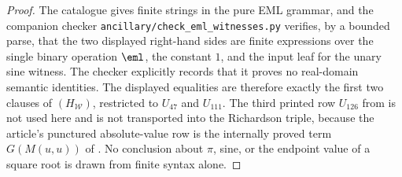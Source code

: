 \begin{proof}
The catalogue gives finite strings in the pure EML grammar, and the companion
checker \texttt{ancillary/check\_eml\_witnesses.py} verifies, by a bounded parse,
that the two displayed right-hand sides are finite expressions over the single
binary operation \(\eml\), the constant \(1\), and the input leaf for the unary
sine witness.  The checker explicitly records that it proves no real-domain
semantic identities.  The displayed equalities are therefore exactly the first
two clauses of \((H_{\mathcal W})\), restricted to \(U_{47}\) and \(U_{111}\).
The third printed row \(U_{126}\) from  is not used here and is not
transported into the Richardson triple, because the article's punctured
absolute-value row is the internally proved term \(G(M(u,u))\) of
.  No conclusion about \(\pi\), sine, or
the endpoint value of a square root is drawn from finite syntax alone.
\end{proof}

